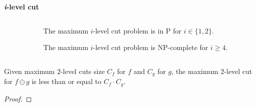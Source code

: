 \documentclass[english, aspectratio=169]{beamer}
\begin{document}
\begin{frame}
  \begin{center}
    \textbf{\LARGE \emph{i}-level cut}
  \end{center}
  \begin{columns}
    \begin{column}{0.55\textwidth}
      \begin{tikzpicture}[scale=0.9]
        
      \end{tikzpicture}
    \end{column}
    \begin{column}{0.44\textwidth}
       {
        \begin{lemma}
          The maximum $i$-level cut problem is in P for $i \in \{ 1,2 \}$.
        \end{lemma}

        \begin{theorem}
          The maximum $i$-level cut problem is NP-complete for $i \geq 4$.
        \end{theorem}
      }
    \end{column}
  \end{columns}
\end{frame}

\blankframe

\begin{frame}
  \begin{theorem}
    Given maximum $2$-level cuts size $C_f$ for $f$ and $C_g$ for $g$, the
    maximum $2$-level cut for $f \odot g$ is less than or equal to
    $C_f \cdot C_g$.
  \end{theorem}

  \begin{proof}
  \end{proof}
\end{frame}
\end{document}
